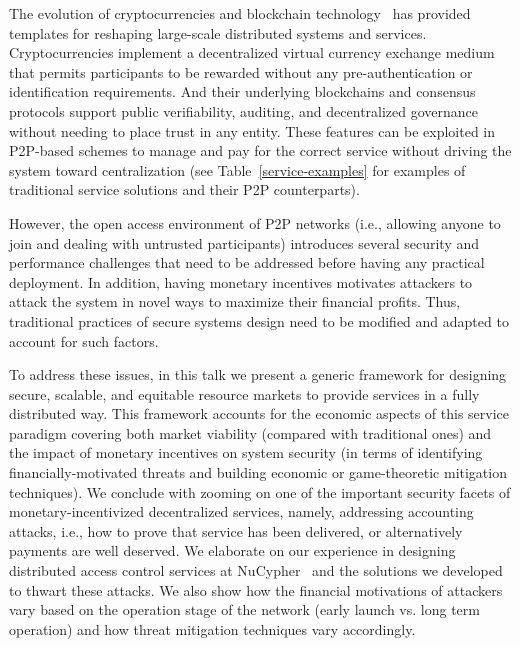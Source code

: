 \documentclass{llncs}
\begin{document}
The evolution of cryptocurrencies and blockchain technology~\cite{bitcoin,ethereum} has provided templates for reshaping large-scale distributed systems and services. Cryptocurrencies implement a decentralized virtual currency exchange medium that permits participants to be rewarded without any pre-authentication or identification requirements. And their underlying blockchains and consensus protocols support public verifiability, auditing, and decentralized governance without needing to place trust in any entity. These features can be exploited in P2P-based schemes to manage and pay for the correct service without driving the system toward centralization (see Table~\ref{service-examples} for examples of traditional service solutions and their P2P counterparts).


However, the open access environment of P2P networks (i.e., allowing anyone to join and dealing with untrusted participants) introduces several security and performance challenges that need to be addressed before having any practical deployment. In addition, having monetary incentives motivates attackers to attack the system in novel ways to maximize their financial profits. Thus, traditional practices of secure systems design need to be modified and adapted to account for such factors. 


To address these issues, in this talk we present a generic framework for designing secure, scalable, and equitable resource markets to provide services in a fully distributed way. This framework accounts for the economic aspects of this service paradigm covering both market viability (compared with traditional ones) and the impact of monetary incentives on system security (in terms of identifying financially-motivated threats and building economic or game-theoretic mitigation techniques). We conclude with zooming on one of the important security facets of monetary-incentivized decentralized services, namely, addressing accounting attacks, i.e., how to prove that service has been delivered, or alternatively payments are well deserved. We elaborate on our experience in designing distributed access control services at NuCypher~\cite{nucypher} and the solutions we developed to thwart these attacks. We also show how the financial motivations of attackers vary based on the operation stage of the network (early launch vs. long term operation) and how threat mitigation techniques vary accordingly.
\end{document}
